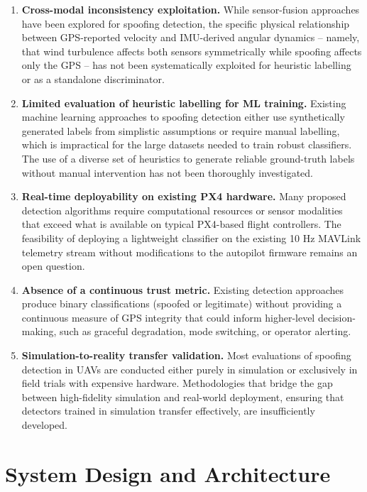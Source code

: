 \documentclass[electronics,article,accept,moreauthors]{Definitions/mdpi}
\begin{document}
\begin{enumerate}
\item \textbf{Cross-modal inconsistency exploitation.} While sensor-fusion approaches have been explored for spoofing detection, the specific physical relationship between GPS-reported velocity and IMU-derived angular dynamics -- namely, that wind turbulence affects both sensors symmetrically while spoofing affects only the GPS -- has not been systematically exploited for heuristic labelling or as a standalone discriminator.

\item \textbf{Limited evaluation of heuristic labelling for ML training.} Existing machine learning approaches to spoofing detection either use synthetically generated labels from simplistic assumptions or require manual labelling, which is impractical for the large datasets needed to train robust classifiers. The use of a diverse set of heuristics to generate reliable ground-truth labels without manual intervention has not been thoroughly investigated.

\item \textbf{Real-time deployability on existing PX4 hardware.} Many proposed detection algorithms require computational resources or sensor modalities that exceed what is available on typical PX4-based flight controllers. The feasibility of deploying a lightweight classifier on the existing 10 Hz MAVLink telemetry stream without modifications to the autopilot firmware remains an open question.

\item \textbf{Absence of a continuous trust metric.} Existing detection approaches produce binary classifications (spoofed or legitimate) without providing a continuous measure of GPS integrity that could inform higher-level decision-making, such as graceful degradation, mode switching, or operator alerting.

\item \textbf{Simulation-to-reality transfer validation.} Most evaluations of spoofing detection in UAVs are conducted either purely in simulation or exclusively in field trials with expensive hardware. Methodologies that bridge the gap between high-fidelity simulation and real-world deployment, ensuring that detectors trained in simulation transfer effectively, are insufficiently developed.
\end{enumerate}

\section{System Design and Architecture}
\label{sec:systemdesign}
\end{document}

